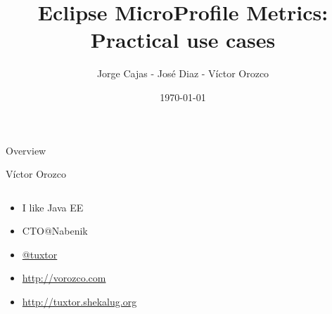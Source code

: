 \documentclass{beamer}
\title{Eclipse MicroProfile Metrics: Practical use cases}
\author{Jorge Cajas - José Diaz - Víctor Orozco}
\institute{GuateJUG - PeruJUG}
\date{\today}
\begin{document}
\frame{\titlepage}

\begin{frame}{Overview}
\tableofcontents
\end{frame} 


\begin{frame}{Víctor Orozco}
\begin{columns}[T] %
	\begin{column}[T]{6cm} %
		\begin{itemize}
			\item I like Java EE
			\item CTO@Nabenik
			\item \href{https://twitter.com/tuxtor}{@tuxtor}
			\item \href{http://vorozco.com}{http://vorozco.com}
			\item \href{http://tuxtor.shekalug.org}{http://tuxtor.shekalug.org} 
		\end{itemize}
	\end{column}
	\begin{column}[T]{4cm} %
		\begin{figure}
			\centering

\end{figure}
\end{column}
\end{columns}
\end{frame}
\end{document}
